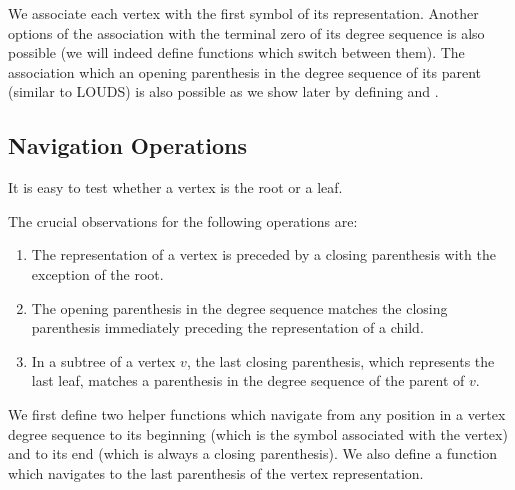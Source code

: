 We associate each vertex with the first symbol of its representation.
Another options of the association with the terminal zero of its degree sequence is also possible (we will indeed define functions which switch between them).
The association which an opening parenthesis in the degree sequence of its parent (similar to LOUDS) is also possible as we show later by defining \dfudsRank{} and \dfudsSelect{}.

\subsection{Navigation Operations}

It is easy to test whether a vertex is the root or a leaf.

\begin{algorithm}
\begin{algorithmic}
	\State {} 
\EndFunction
\end{algorithmic}
\end{algorithm}

\begin{algorithm}
\begin{algorithmic}
	\State {} 
\EndFunction
\end{algorithmic}
\end{algorithm}

The crucial observations for the following operations are:
\begin{enumerate}
	\item The representation of a vertex is preceded by a closing parenthesis with the exception of the root.
	\item The opening parenthesis in the degree sequence matches the closing parenthesis immediately preceding the representation of a child.
	\item In a subtree of a vertex $v$, the last closing parenthesis, which represents the last leaf, matches a parenthesis in the degree sequence of the parent of $v$.
\end{enumerate}

We first define two helper functions which navigate from any position in a vertex degree sequence to its beginning (which is the symbol associated with the vertex) and to its end (which is always a closing parenthesis).
We also define a function which navigates to the last parenthesis of the vertex representation.

